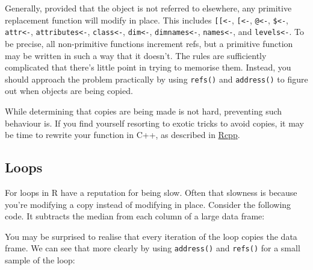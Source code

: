 Generally, provided that the object is not referred to elsewhere, any
primitive replacement function will modify in place. This includes
\texttt{{[}{[}\textless{}-}, \texttt{{[}\textless{}-},
\texttt{@\textless{}-}, \texttt{\$\textless{}-},
\texttt{attr\textless{}-}, \texttt{attributes\textless{}-},
\texttt{class\textless{}-}, \texttt{dim\textless{}-},
\texttt{dimnames\textless{}-}, \texttt{names\textless{}-}, and
\texttt{levels\textless{}-}. To be precise, all non-primitive functions
increment refs, but a primitive function may be written in such a way
that it doesn't. The rules are sufficiently complicated that there's
little point in trying to memorise them. Instead, you should approach
the problem practically by using \texttt{refs()} and \texttt{address()}
to figure out when objects are being copied.

While determining that copies are being made is not hard, preventing
such behaviour is. If you find yourself resorting to exotic tricks to
avoid copies, it may be time to rewrite your function in C++, as
described in \hyperref[rcpp]{Rcpp}.

\subsection{Loops}

For loops in R have a reputation for being slow. Often that slowness is
because you're modifying a copy instead of modifying in place. Consider
the following code. It subtracts the median from each column of a large
data frame: 

\begin{Shaded}
\begin{Highlighting}[]
\StringTok{ }\NormalTok{(}\NormalTok{(}\NormalTok{(} \NormalTok{*}\StringTok{ }\NormalTok{), } \NormalTok{))}
\StringTok{ }\NormalTok{(}\NormalTok{))}

  \StringTok{ }\StringTok{ }
\NormalTok{\}}
\end{Highlighting}
\end{Shaded}

You may be surprised to realise that every iteration of the loop copies
the data frame. We can see that more clearly by using \texttt{address()}
and \texttt{refs()} for a small sample of the loop:


